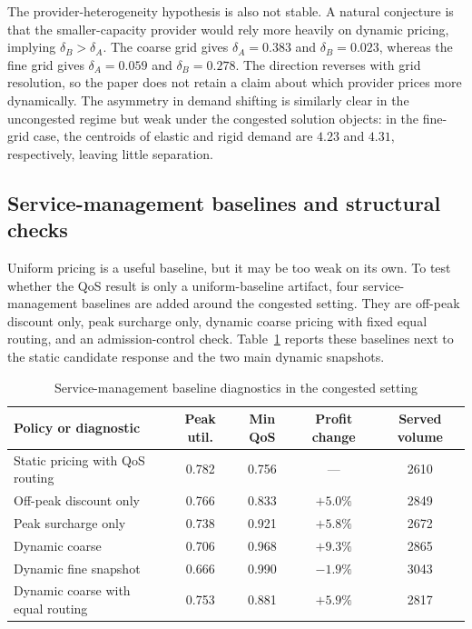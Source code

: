 \documentclass[11pt,a4paper]{article}
\begin{document}
The provider-heterogeneity hypothesis is also not stable. A natural conjecture is that the smaller-capacity provider would rely more heavily on dynamic pricing, implying $\delta_B>\delta_A$. The coarse grid gives $\delta_A=0.383$ and $\delta_B=0.023$, whereas the fine grid gives $\delta_A=0.059$ and $\delta_B=0.278$. The direction reverses with grid resolution, so the paper does not retain a claim about which provider prices more dynamically. The asymmetry in demand shifting is similarly clear in the uncongested regime but weak under the congested solution objects: in the fine-grid case, the centroids of elastic and rigid demand are $4.23$ and $4.31$, respectively, leaving little separation.

\subsection{Service-management baselines and structural checks}

Uniform pricing is a useful baseline, but it may be too weak on its own. To test whether the QoS result is only a uniform-baseline artifact, four service-management baselines are added around the congested setting. They are off-peak discount only, peak surcharge only, dynamic coarse pricing with fixed equal routing, and an admission-control check. Table~\ref{tab:smpt_baselines} reports these baselines next to the static candidate response and the two main dynamic snapshots.

\begin{table}[H]
\centering
\caption{Service-management baseline diagnostics in the congested setting}
\label{tab:smpt_baselines}
\small
\begin{tabular}{lcccc}
\toprule
Policy or diagnostic & Peak util. & Min QoS & Profit change & Served volume \\
\midrule
Static pricing with QoS routing & 0.782 & 0.756 & --- & 2610 \\
Off-peak discount only & 0.766 & 0.833 & $+5.0\%$ & 2849 \\
Peak surcharge only & 0.738 & 0.921 & $+5.8\%$ & 2672 \\
Dynamic coarse & 0.706 & 0.968 & $+9.3\%$ & 2865 \\
Dynamic fine snapshot & 0.666 & 0.990 & $-1.9\%$ & 3043 \\
Dynamic coarse with equal routing & 0.753 & 0.881 & $+5.9\%$ & 2817 \\
\bottomrule
\end{tabular}
\end{table}
\end{document}
